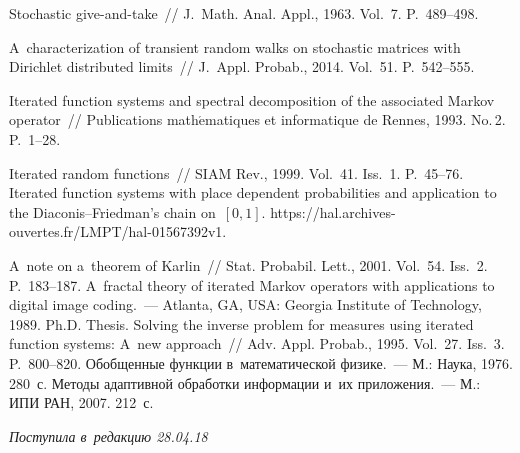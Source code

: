 \begin{multicols}{2}
{{\begin{thebibliography}{99}
   Stochastic give-and-take~// J.~Math. Anal. Appl., 1963. 
Vol.~7. P.~489--498.

   A~characterization of transient random walks on stochastic matrices with 
Dirichlet distributed limits~// J.~Appl. Probab., 2014. Vol.~51. P.~542--555.

   Iterated function systems and spectral decomposition of 
the associated Markov operator~// Publications math$\acute{\mbox{e}}$matiques et 
informatique de Rennes, 1993. No.\,2. P.~1--28.

   Iterated random functions~// SIAM Rev., 1999. Vol.~41. 
Iss.~1. P.~45--76.
   Iterated function systems with place 
dependent probabilities and application to the Diaconis--Friedman's chain on~$[0,1]$. {\sf 
https://hal.archives-ouvertes.fr/LMPT/hal-01567392v1}.
 
   A~note on a~theorem of Karlin~// Stat. Probabil. 
Lett., 2001. Vol.~54. Iss.~2. P.~183--187.
   A~fractal theory of iterated Markov operators with applications to digital 
image coding.~--- Atlanta, GA, USA: Georgia Institute of Technology, 1989. Ph.D. Thesis.
   Solving the inverse problem for measures using iterated 
function systems: A~new approach~// Adv. Appl. Probab., 1995. 
Vol.~27. Iss.~3. P.~800--820.
   Обобщенные функции в~математической физике.~--- М.: 
Наука, 1976. 280~с.
   Методы адаптивной обработки информации и~их  
приложения.~--- М.: ИПИ РАН, 2007. 212~с.

 \end{thebibliography}

 }
 }

\end{multicols}

\vspace*{-6pt}

\hfill{\small\textit{Поступила в~редакцию 28.04.18}}

\vspace*{6pt}



